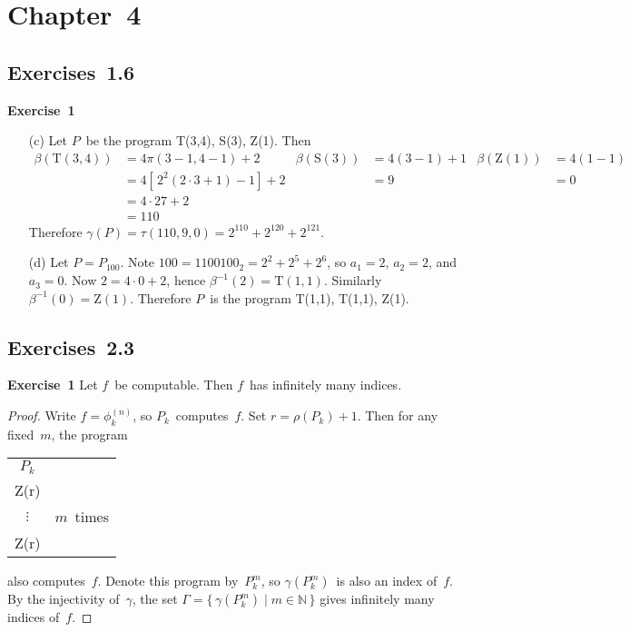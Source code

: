\documentclass[letterpaper]{article}
\newcommand{\exercise}[2][]{\noindent\textbf{Exercise~{#2}}\ifthenelse{\isempty{#1}}{\textbf{.}}{ ({#1})\textbf{.}}}
\newcommand{\N}{\mathbb{N}}
\theoremstyle{plain}
\theoremstyle{definition}
\theoremstyle{remark}
\begin{document}
\section*{Chapter~4}
\subsection*{Exercises~1.6}
\exercise{1}
\begin{enumerate}[itemsep=0pt]
\item[(c)] Let $P$~be the program T(3,4), S(3), Z(1). Then
\begin{align*}
\beta(\mathrm{T(3,4)})&=4\pi(3-1,4-1)+2&\beta(\mathrm{S(3)})&=4(3-1)+1&\beta(\mathrm{Z(1)})&=4(1-1)\\
	&=4[\,2^2(2\cdot 3+1)-1]+2&&=9&&=0\\
	&=4\cdot 27+2&&&&\\
	&=110&&&&
\end{align*}
Therefore $\gamma(P)=\tau(110,9,0)=2^{110}+2^{120}+2^{121}$.
\item[(d)] Let $P=P_{100}$. Note $100=1100100_2=2^2+2^5+2^6$, so $a_1=2$, $a_2=2$, and $a_3=0$. Now $2=4\cdot 0+2$, hence $\beta^{-1}(2)=\mathrm{T(1,1)}$. Similarly $\beta^{-1}(0)=\mathrm{Z(1)}$. Therefore $P$~is the program T(1,1), T(1,1), Z(1).
\end{enumerate}

\subsection*{Exercises~2.3}
\exercise{1}
Let $f$~be computable. Then $f$~has infinitely many indices.
\begin{proof}
Write $f=\phi_k^{(n)}$, so $P_k$~computes~$f$. Set $r=\rho(P_k)+1$. Then for any fixed~$m$, the program
\begin{center}
\begin{tabular}{cl}
$P_k$&\\
Z(r)&\\
$\vdots$&\quad $m$~times\\
Z(r)&
\end{tabular}
\end{center}
also computes~$f$. Denote this program by~$P_k^m$, so $\gamma(P_k^m)$~is also an index of~$f$. By the injectivity of~$\gamma$, the set $\Gamma=\{\,\gamma(P_k^m)\mid m\in\N\,\}$ gives infinitely many indices of~$f$.
\end{proof}
\end{document}
